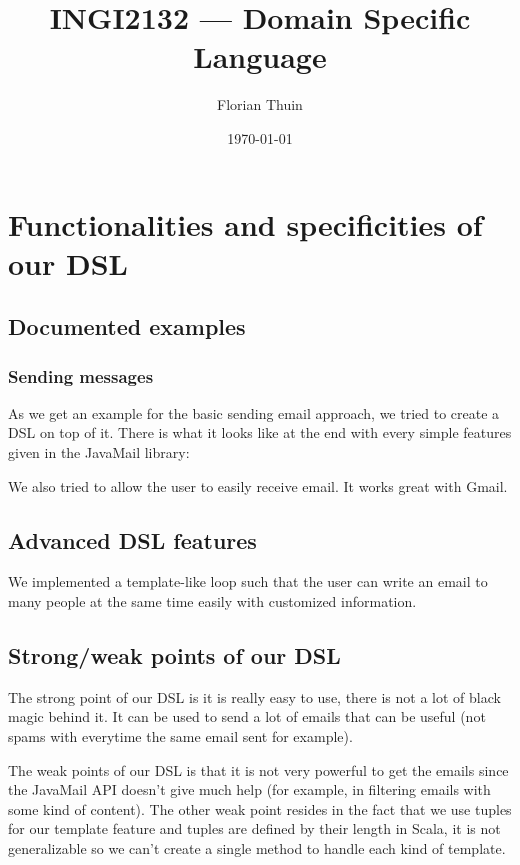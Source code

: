 \documentclass[a4paper, 11pt]{article}
\author{Florian Thuin}
\date{\today}
\title{INGI2132 --- Domain Specific Language}
\begin{document}
    \maketitle
    \tableofcontents

    \section{Functionalities and specificities of our DSL}
    \subsection{Documented examples}
    \subsubsection{Sending messages}
    As we get an example for the basic sending email approach, we tried to
    create a DSL on top of it. There is what it looks like at the end with
    every simple features given in the JavaMail library:

    

    We also tried to allow the user to easily receive email. It works great
    with Gmail.

    

    \subsection{Advanced DSL features}
    We implemented a template-like loop such that the user can write an
    email to many people at the same time easily with customized information.

    
    \subsection{Strong/weak points of our DSL}
    The strong point of our DSL is it is really easy to use, there is not a lot
    of black magic behind it. It can be used to send a lot of emails that can
    be useful (not spams with everytime the same email sent for example). \newline

    The weak points of our DSL is that it is not very powerful to get the emails
    since the JavaMail API doesn't give much help (for example, in filtering
    emails with some kind of content). The other weak point resides in the fact
    that we use tuples for our template feature and tuples are defined by their
    length in Scala, it is not generalizable so we can't create a single method
    to handle each kind of template.
\end{document}
